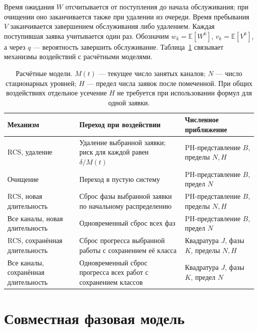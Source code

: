 Время ожидания \(W\) отсчитывается от поступления до начала обслуживания; при очищении оно заканчивается также при удалении из очереди. Время пребывания \(V\) заканчивается завершением обслуживания либо удалением. Каждая поступившая заявка учитывается один раз. Обозначим \(w_k=\mathbb E[W^k]\), \(v_k=\mathbb E[V^k]\), а через \(q\) --- вероятность завершить обслуживание. Таблица~\ref{tab:methods} связывает механизмы воздействий с расчётными моделями.

\begin{table}[!htbp]
\centering\small
\begin{tabular}{@{}p{3.6cm}p{6.0cm}p{5.0cm}@{}}
\toprule
Механизм & Переход при воздействии & Численное приближение \\
\midrule
RCS, удаление & Удаление выбранной заявки; риск для каждой равен \(\delta/M(t)\) & PH-представление \(B\), пределы \(N,H\) \\
Очищение & Переход в пустую систему & PH-представление \(B\), предел \(N\) \\
RCS, новая длительность & Сброс фазы выбранной заявки по начальному распределению & PH-представление \(B\), пределы \(N,H\) \\
Все каналы, новая длительность & Одновременный сброс всех фаз & PH-представление \(B\), предел \(N\) \\
RCS, сохранённая длительность & Сброс прогресса выбранной работы с сохранением её класса & Квадратура \(J\), фазы \(K\), пределы \(N,H\) \\
Все каналы, сохранённая длительность & Одновременный сброс прогресса всех работ с сохранением классов & Квадратура \(J\), фазы \(K\), предел \(N\) \\
\bottomrule
\end{tabular}
\caption{Расчётные модели. \(M(t)\) --- текущее число занятых каналов; \(N\) --- число стационарных уровней; \(H\) --- предел числа заявок после помеченной. При общих воздействиях отдельное усечение \(H\) не требуется при использовании формул для одной заявки.}
\label{tab:methods}
\end{table}

\section{Совместная фазовая модель}
